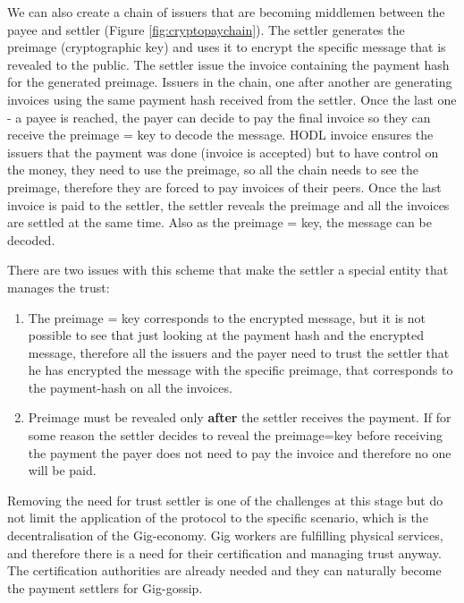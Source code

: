 \documentclass{article}
\begin{document}
We can also create a chain of issuers that are becoming middlemen between the payee and settler (Figure \ref{fig:cryptopaychain}). The settler generates the preimage (cryptographic key) and uses it to encrypt the specific message that is revealed to the public. The settler issue the invoice containing the payment hash for the generated preimage. Issuers in the chain, one after another are generating invoices using the same payment hash received from the settler. Once the last one - a payee is reached, the payer can decide to pay the final invoice so they can receive the preimage = key to decode the message. HODL invoice ensures the issuers that the payment was done (invoice is accepted) but to have control on the money, they need to use the preimage, so all the chain needs to see the preimage, therefore they are forced to pay invoices of their peers. Once the last invoice is paid to the settler, the settler reveals the preimage and all the invoices are settled at the same time. Also as the preimage = key, the message can be decoded.

There are two issues with this scheme that make the settler a special entity that manages the trust:
\begin{enumerate}
	\item The preimage = key corresponds to the encrypted message, but it is not possible to see that just looking at the payment hash and the encrypted message, therefore all the issuers and the payer need to trust the settler that he has encrypted the message with the specific preimage, that corresponds to the payment-hash on all the invoices.
	\item Preimage must be revealed only \textbf{after} the settler receives the payment. If for some reason the settler decides to reveal the preimage=key before receiving the payment the payer does not need to pay the invoice and therefore no one will be paid.
\end{enumerate}

Removing the need for trust settler is one of the challenges at this stage but do not limit the application of the protocol to the specific scenario, which is the decentralisation of the Gig-economy. Gig workers are fulfilling physical services, and therefore there is a need for their certification and managing trust anyway. The certification authorities are already needed and they can naturally become the payment settlers for Gig-gossip.
\end{document}
